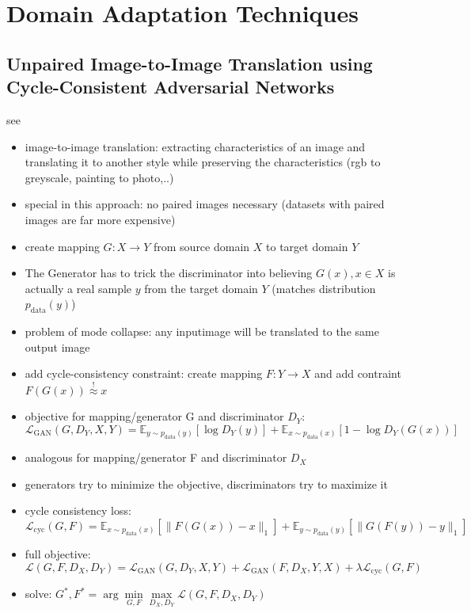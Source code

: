 \chapter{Domain Adaptation Techniques}
\label{sec:techniques}

\section{Unpaired Image-to-Image Translation using Cycle-Consistent Adversarial Networks}
see \cite{DBLP:journals/corr/ZhuPIE17}

\begin{itemize}
	\item image-to-image translation: extracting characteristics of an image and translating it to another style while preserving the characteristics (rgb to greyscale, painting to photo,..)
	\item special in this approach: no paired images necessary (datasets with paired images are far more expensive)
	\item create mapping $G: X \rightarrow Y$ from source domain $X$ to target domain $Y$
	\item The Generator has to trick the discriminator into believing $G(x), x \in X$ is actually a real sample $y$ from the target domain $Y$ (matches distribution $p_{\text{data}}(y)$)
	\item problem of mode collapse: any inputimage will be translated to the same output image
	\item add cycle-consistency constraint: create mapping $F: Y \rightarrow X$ and add contraint $F(G(x)) \overset{!}{\approx} x$ 
	\item objective for mapping/generator G and discriminator $D_Y$: \\
	$\mathcal{L}_{\text{GAN}}(G, D_Y, X, Y) = \mathbb{E}_{y\sim p_{\text{data}}(y)}[\log D_Y(y)] + \mathbb{E}_{x\sim p_{\text{data}}(x)}[1 - \log D_Y(G(x))]$
	\item analogous for mapping/generator F and discriminator $D_X$
	\item generators try to minimize the objective, discriminators try to maximize it
	\item cycle consistency loss:\\
	$\mathcal{L}_{\text{cyc}}(G, F) =  \mathbb{E}_{x\sim p_{\text{data}}(x)} [\lVert F(G(x))- x \rVert_1] + \mathbb{E}_{y\sim p_{\text{data}}(y)} [\lVert G(F(y))- y \rVert_1]$
	\item full objective:\\
	$\mathcal{L}(G,F,D_X,D_Y) = \mathcal{L}_{\text{GAN}}(G, D_Y, X, Y) + \mathcal{L}_{\text{GAN}}(F, D_X, Y, X) + \lambda \mathcal{L}_{\text{cyc}}(G, F)$
	\item solve: $G^*, F^* = \arg \underset{G,F}{\min}\underset{D_X, D_Y}{\max} \mathcal{L}(G,F,D_X,D_Y)$
\end{itemize}

